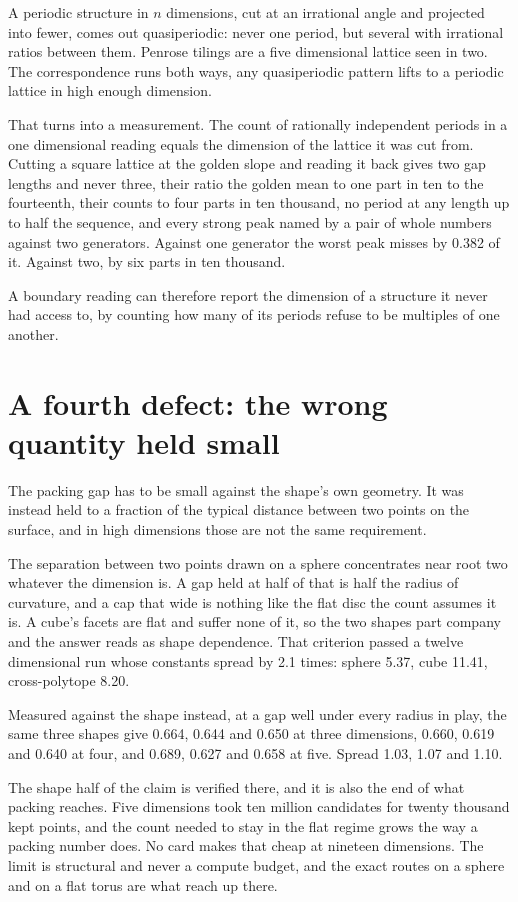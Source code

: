 A periodic structure in $n$ dimensions, cut at an irrational angle and projected into fewer, comes
out quasiperiodic: never one period, but several with irrational ratios between them. Penrose
tilings are a five dimensional lattice seen in two. The correspondence runs both ways, any
quasiperiodic pattern lifts to a periodic lattice in high enough dimension.

That turns into a measurement. The count of rationally independent periods in a one dimensional
reading equals the dimension of the lattice it was cut from. Cutting a square lattice at the golden
slope and reading it back gives two gap lengths and never three, their ratio the golden mean to one
part in ten to the fourteenth, their counts to four parts in ten thousand, no period at any length
up to half the sequence, and every strong peak named by a pair of whole numbers against two
generators. Against one generator the worst peak misses by 0.382 of it. Against two, by six parts in
ten thousand.

A boundary reading can therefore report the dimension of a structure it never had access to, by counting
how many of its periods refuse to be multiples of one another.

\section{A fourth defect: the wrong quantity held small}

The packing gap has to be small against the shape's own geometry. It was instead held to a fraction
of the typical distance between two points on the surface, and in high dimensions those are not the
same requirement.

The separation between two points drawn on a sphere concentrates near root two whatever the
dimension is. A gap held at half of that is half the radius of curvature, and a cap that wide is
nothing like the flat disc the count assumes it is. A cube's facets are flat and suffer none of it,
so the two shapes part company and the answer reads as shape dependence. That criterion passed a
twelve dimensional run whose constants spread by 2.1 times: sphere 5.37, cube 11.41, cross-polytope
8.20.

Measured against the shape instead, at a gap well under every radius in play, the same three shapes
give 0.664, 0.644 and 0.650 at three dimensions, 0.660, 0.619 and 0.640 at four, and 0.689, 0.627
and 0.658 at five. Spread 1.03, 1.07 and 1.10.

The shape half of the claim is verified there, and it is also the end of what packing reaches. Five
dimensions took ten million candidates for twenty thousand kept points, and the count needed to stay
in the flat regime grows the way a packing number does. No card makes that cheap at nineteen
dimensions. The limit is structural and never a compute budget, and the exact routes on a sphere and
on a flat torus are what reach up there.

